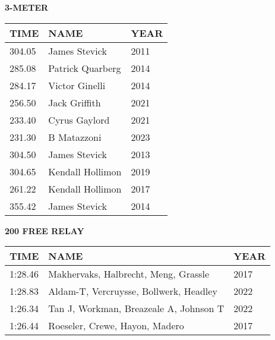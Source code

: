 \vspace{0.4cm}

\begin{center}
\begin{minipage}[t]{0.7\textwidth}
\centering
\textbf{3-METER}\\[0.05cm]
\begin{tabular}{@{}p{1.8cm}p{2.8cm}p{1.2cm}@{}}
\hline
\textbf{TIME} & \textbf{NAME} & \textbf{YEAR} \\
\hline
304.05 & James Stevick & 2011 \\
285.08 & Patrick Quarberg & 2014 \\
284.17 & Victor Ginelli & 2014 \\
256.50 & Jack Griffith & 2021 \\
233.40 & Cyrus Gaylord & 2021 \\
231.30 & B Matazzoni & 2023 \\
304.50 & James Stevick & 2013 \\
304.65 & Kendall Hollimon & 2019 \\
261.22 & Kendall Hollimon & 2017 \\
355.42 & James Stevick & 2014 \\
\hline
\end{tabular}
\end{minipage}
\end{center}

\vspace{0.4cm}

\begin{center}
\begin{minipage}[t]{0.7\textwidth}
\centering
\textbf{200 FREE RELAY}\\[0.05cm]
\begin{tabular}{@{}p{1.8cm}p{2.8cm}p{1.2cm}@{}}
\hline
\textbf{TIME} & \textbf{NAME} & \textbf{YEAR} \\
\hline
1:28.46 & Makhervaks, Halbrecht, Meng, Grassle & 2017 \\
1:28.83 & Aldam-T, Vercruysse, Bollwerk, Headley & 2022 \\
1:26.34 & Tan J, Workman, Breazeale A, Johnson T & 2022 \\
1:26.44 & Roeseler, Crewe, Hayon, Madero & 2017 \\
\hline
\end{tabular}
\end{minipage}
\end{center}

\vspace{0.4cm}

